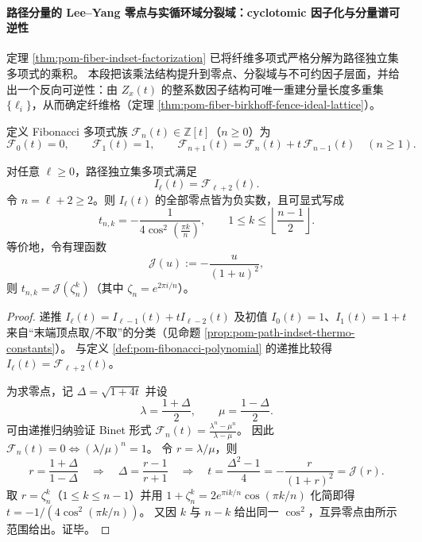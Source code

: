 \paragraph{路径分量的 Lee--Yang 零点与实循环域分裂域：cyclotomic 因子化与分量谱可逆性}
定理 \ref{thm:pom-fiber-indset-factorization} 已将纤维多项式严格分解为路径独立集多项式的乘积。
本段把该乘法结构提升到零点、分裂域与不可约因子层面，并给出一个反向可逆性：由 \(Z_x(t)\) 的整系数因子结构可唯一重建分量长度多重集 \(\{\ell_i\}\)，从而确定纤维格（定理 \ref{thm:pom-fiber-birkhoff-fence-ideal-lattice}）。

\begin{definition}\label{def:pom-fibonacci-polynomial}
定义 Fibonacci 多项式族 \(\mathcal F_n(t)\in\mathbb Z[t]\)（\(n\ge 0\)）为
\[
\mathcal F_0(t)=0,\qquad \mathcal F_1(t)=1,\qquad
\mathcal F_{n+1}(t)=\mathcal F_n(t)+t\,\mathcal F_{n-1}(t)\quad(n\ge 1).
\]
\end{definition}

\begin{theorem}\label{thm:pom-path-indset-leyang-cyclotomic-param}
对任意 \(\ell\ge 0\)，路径独立集多项式满足
\[
I_\ell(t)=\mathcal F_{\ell+2}(t).
\]
令 \(n=\ell+2\ge 2\)。则 \(I_\ell(t)\) 的全部零点皆为负实数，且可显式写成
\[
t_{n,k}=-\frac{1}{4\cos^2\!\left(\frac{\pi k}{n}\right)},
\qquad
1\le k\le \left\lfloor\frac{n-1}{2}\right\rfloor.
\]
等价地，令有理函数
\[
\mathcal J(u):=-\frac{u}{(1+u)^2},
\]
则 \(t_{n,k}=\mathcal J(\zeta_n^k)\)（其中 \(\zeta_n=e^{2\pi i/n}\)）。
\end{theorem}

\begin{proof}
递推 \(I_\ell(t)=I_{\ell-1}(t)+tI_{\ell-2}(t)\) 及初值 \(I_0(t)=1\)、\(I_1(t)=1+t\) 来自“末端顶点取/不取”的分类（见命题 \ref{prop:pom-path-indset-thermo-constants}）。
与定义 \ref{def:pom-fibonacci-polynomial} 的递推比较得 \(I_\ell(t)=\mathcal F_{\ell+2}(t)\)。

为求零点，记 \(\Delta=\sqrt{1+4t}\) 并设
\[
\lambda=\frac{1+\Delta}{2},\qquad \mu=\frac{1-\Delta}{2}.
\]
可由递推归纳验证 Binet 形式
\(
\mathcal F_n(t)=\frac{\lambda^n-\mu^n}{\lambda-\mu}
\)。
因此 \(\mathcal F_n(t)=0\iff (\lambda/\mu)^n=1\)。
令 \(r=\lambda/\mu\)，则
\[
r=\frac{1+\Delta}{1-\Delta}\quad\Longrightarrow\quad
\Delta=\frac{r-1}{r+1}
\quad\Longrightarrow\quad
t=\frac{\Delta^2-1}{4}=-\frac{r}{(1+r)^2}=\mathcal J(r).
\]
取 \(r=\zeta_n^k\)（\(1\le k\le n-1\)）并用
\(
1+\zeta_n^k=2e^{\pi i k/n}\cos(\pi k/n)
\)
化简即得
\(
t=-1/(4\cos^2(\pi k/n))
\)。
又因 \(k\) 与 \(n-k\) 给出同一 \(\cos^2\)，互异零点由所示范围给出。证毕。
\end{proof}

